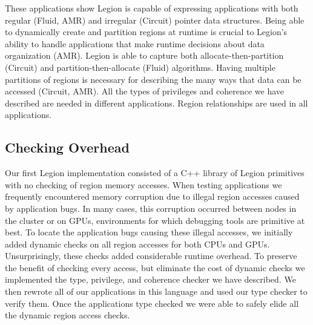 These applications show Legion is capable of 
expressing applications with both regular (Fluid, AMR) and irregular (Circuit) pointer data structures.
Being able to dynamically create and partition regions at runtime is crucial to Legion's
ability to handle applications that make runtime decisions about data organization (AMR).  Legion
is able to capture both allocate-then-partition (Circuit) and partition-then-allocate (Fluid) algorithms. 
Having multiple partitions of regions is necessary for describing the many ways 
that data can be accessed (Circuit, AMR).  All the types of privileges and coherence we have
described are needed in different applications.  Region relationships
are used in all applications. %

\subsection{Checking Overhead}
\label{subsec:overhead}
Our first Legion implementation consisted of a C++ library of Legion primitives
\cite{Legion12} with no checking of region memory accesses.  
When testing applications we frequently encountered memory corruption due to
illegal region accesses caused by application bugs.
In many cases, this corruption occurred between nodes in the cluster or on 
GPUs, environments for which debugging tools are primitive at best.
To locate the application bugs causing these illegal accesses, we initially added 
dynamic checks on  all region accesses for both CPUs and GPUs.  
Unsurprisingly, these checks added considerable runtime overhead.  
To preserve the benefit of checking every access, but eliminate the cost of dynamic checks we implemented the type, privilege, and coherence checker we have described. 
We then rewrote all of our applications in this language and used our type checker to verify them.  Once the applications type checked we were
able to safely elide all the dynamic region access checks.


